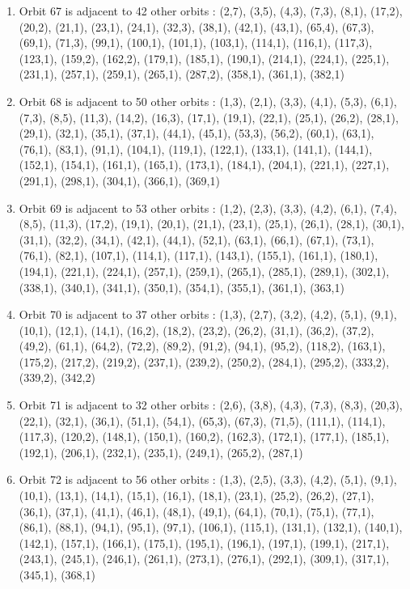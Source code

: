 \documentclass[12pt]{article}
\begin{document}
\begin{enumerate}
\item Orbit 67 is adjacent to 42 other orbits : (2,7), (3,5), (4,3), (7,3), (8,1), (17,2), (20,2), (21,1), (23,1), (24,1), (32,3), (38,1), (42,1), (43,1), (65,4), (67,3), (69,1), (71,3), (99,1), (100,1), (101,1), (103,1), (114,1), (116,1), (117,3), (123,1), (159,2), (162,2), (179,1), (185,1), (190,1), (214,1), (224,1), (225,1), (231,1), (257,1), (259,1), (265,1), (287,2), (358,1), (361,1), (382,1)
\item Orbit 68 is adjacent to 50 other orbits : (1,3), (2,1), (3,3), (4,1), (5,3), (6,1), (7,3), (8,5), (11,3), (14,2), (16,3), (17,1), (19,1), (22,1), (25,1), (26,2), (28,1), (29,1), (32,1), (35,1), (37,1), (44,1), (45,1), (53,3), (56,2), (60,1), (63,1), (76,1), (83,1), (91,1), (104,1), (119,1), (122,1), (133,1), (141,1), (144,1), (152,1), (154,1), (161,1), (165,1), (173,1), (184,1), (204,1), (221,1), (227,1), (291,1), (298,1), (304,1), (366,1), (369,1)
\item Orbit 69 is adjacent to 53 other orbits : (1,2), (2,3), (3,3), (4,2), (6,1), (7,4), (8,5), (11,3), (17,2), (19,1), (20,1), (21,1), (23,1), (25,1), (26,1), (28,1), (30,1), (31,1), (32,2), (34,1), (42,1), (44,1), (52,1), (63,1), (66,1), (67,1), (73,1), (76,1), (82,1), (107,1), (114,1), (117,1), (143,1), (155,1), (161,1), (180,1), (194,1), (221,1), (224,1), (257,1), (259,1), (265,1), (285,1), (289,1), (302,1), (338,1), (340,1), (341,1), (350,1), (354,1), (355,1), (361,1), (363,1)
\item Orbit 70 is adjacent to 37 other orbits : (1,3), (2,7), (3,2), (4,2), (5,1), (9,1), (10,1), (12,1), (14,1), (16,2), (18,2), (23,2), (26,2), (31,1), (36,2), (37,2), (49,2), (61,1), (64,2), (72,2), (89,2), (91,2), (94,1), (95,2), (118,2), (163,1), (175,2), (217,2), (219,2), (237,1), (239,2), (250,2), (284,1), (295,2), (333,2), (339,2), (342,2)
\item Orbit 71 is adjacent to 32 other orbits : (2,6), (3,8), (4,3), (7,3), (8,3), (20,3), (22,1), (32,1), (36,1), (51,1), (54,1), (65,3), (67,3), (71,5), (111,1), (114,1), (117,3), (120,2), (148,1), (150,1), (160,2), (162,3), (172,1), (177,1), (185,1), (192,1), (206,1), (232,1), (235,1), (249,1), (265,2), (287,1)
\item Orbit 72 is adjacent to 56 other orbits : (1,3), (2,5), (3,3), (4,2), (5,1), (9,1), (10,1), (13,1), (14,1), (15,1), (16,1), (18,1), (23,1), (25,2), (26,2), (27,1), (36,1), (37,1), (41,1), (46,1), (48,1), (49,1), (64,1), (70,1), (75,1), (77,1), (86,1), (88,1), (94,1), (95,1), (97,1), (106,1), (115,1), (131,1), (132,1), (140,1), (142,1), (157,1), (166,1), (175,1), (195,1), (196,1), (197,1), (199,1), (217,1), (243,1), (245,1), (246,1), (261,1), (273,1), (276,1), (292,1), (309,1), (317,1), (345,1), (368,1)

\end{enumerate}
\end{document}
